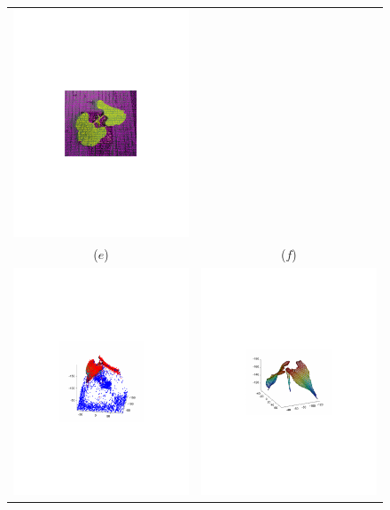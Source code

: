 \begin{figure}
\begin{center}
\begin{tabular}{cc}
\includegraphics[trim=190 280 190 290,clip,width=0.48\linewidth]{Figures/beanPointsOnLeaves} \\
($e$) & ($f$) \\
\includegraphics[trim=190 280 190 290,clip,width=0.48\linewidth]{Figures/bean3DMeshPlusPoints} &
\includegraphics[trim=190 280 190 290,clip,width=0.48\linewidth]{Figures/bean3DMesh} \\

\end{tabular}
\end{center}
\end{figure}
